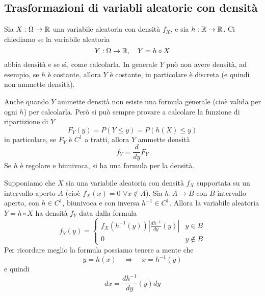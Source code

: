 \subsection{Trasformazioni di variabli aleatorie con densità}
Sia $X : \Omega \to \mathbb{R}$ una variabile aleatoria con densità $f_X$, e sia $h : \mathbb{R} \to \mathbb{R}$. Ci
chiediamo se la variabile aleatoria
\[ Y : \Omega \to \mathbb{R}, \quad Y = h \circ X \]
abbia densità e se sì, come calcolarla. In generale $Y$ può non avere densità, ad esempio, se $h$
è costante, allora $Y$ è costante, in particolare è discreta (e quindi non ammette densità).

Anche quando $Y$ ammette densità non esiste una formula generale (cioè valida per ogni $h$) per
calcolarla. Però si può sempre provare a calcolare la funzione di ripartizione di $Y$
\[ F_Y (y) = P(Y \leq y) = P(h(X) \leq y) \]
in particolare, se $F_Y$ è $C^1$ a tratti, allora $Y$ ammette densità
\[ f_Y = \frac{d}{dy} F_Y \]
Se $h$ è regolare e biunivoca, si ha una formula per la densità.

\begin{proposition}
	Supponiamo che $X$ sia una variabile aleatoria con densità $f_X$ supportata su un intervallo
	aperto $A$ (cioè $f_X(x) = 0$ $\forall x \notin A$). Sia $h : A \to B$ con $B$ intervallo
	aperto, con $h \in C^1$, biunivoca e con inversa $h^{-1} \in C^1$. Allora la variabile
	aleatoria $Y = h \circ X$ ha densità $f_Y$ data dalla formula
	\[
		f_Y(y) = \begin{cases}
			f_X (h^{-1} (y)) \left| \frac{d h^{-1}}{dy} (y) \right| & y \in B    \\[1ex]
			0                                                       & y \notin B
		\end{cases}
	\]
	Per ricordare meglio la formula possiamo tenere a mente che
	\[ y = h(x) \quad \Rightarrow \quad x = h^{-1}(y) \]
	e quindi
	\[ dx = \frac{d h^{-1}}{dy} (y) dy \]
\end{proposition}

